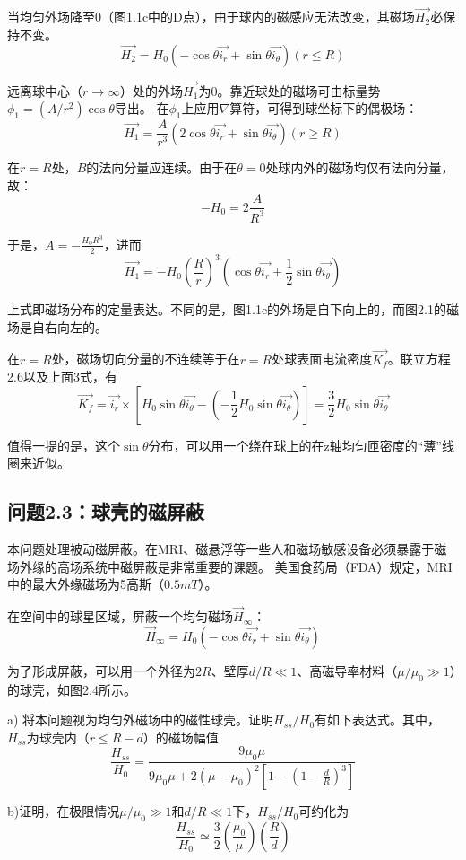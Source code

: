 当均匀外场降至$0$（图1.1c中的D点），由于球内的磁感应无法改变，其磁场$\vec{H_2}$必保持不变。
$$
\vec{H_2}=H_0 (-\cos\theta \vec{i_r}+\sin\theta \vec{i_\theta})  (r\le R)
$$

远离球中心（$r\rightarrow \infty$）处的外场$\vec{H_1}$为0。靠近球处的磁场可由标量势$\phi_1=(A/r^2)\cos\theta$导出。
在$\phi_1$上应用$\nabla$算符，可得到球坐标下的偶极场：
$$
\vec{H_1}=\frac{A}{r^3}(2\cos\theta \vec{i_r}+\sin\theta \vec{i_\theta})  (r\ge R)
$$

在$r=R$处，$B$的法向分量应连续。由于在$\theta=0$处球内外的磁场均仅有法向分量，故：
$$
-H_0=2\frac{A}{R^3}
$$

于是，$A=-\frac{H_0 R^3}{2}$，进而
$$
\vec{H_1}=-H_0(\frac{R}{r})^3 (\cos\theta \vec{i_r}+\frac{1}{2}\sin\theta \vec{i_\theta})
$$

上式即磁场分布的定量表达。不同的是，图1.1c的外场是自下向上的，而图2.1的磁场是自右向左的。

在$r=R$处，磁场切向分量的不连续等于在$r=R$处球表面电流密度$\vec{K_f}$。联立方程2.6以及上面3式，有
\begin{equation}
  \vec{K_f}=\vec{i_r}\times [H_0 \sin\theta \vec{i_\theta}-(-\frac{1}{2}H_0 \sin\theta \vec{i_\theta})]=\frac{3}{2}H_0\sin\theta\vec{i_\theta}
\end{equation}

值得一提的是，这个$\sin\theta$分布，可以用一个绕在球上的在z轴均匀匝密度的“薄”线圈来近似。


\subsection{问题2.3：球壳的磁屏蔽}
本问题处理被动磁屏蔽。在MRI、磁悬浮等一些人和磁场敏感设备必须暴露于磁场外缘的高场系统中磁屏蔽是非常重要的课题。
美国食药局（FDA）规定，MRI中的最大外缘磁场为5高斯（$0.5mT$）。

在空间中的球星区域，屏蔽一个均匀磁场$\vec{H}_\infty$：
$$
\vec{H}_\infty=H_0 (-\cos\theta \vec{i_r}+\sin\theta \vec{i_\theta})
$$

为了形成屏蔽，可以用一个外径为$2R$、壁厚$d/R\ll 1$、高磁导率材料（$\mu/\mu_0 \gg 1$）的球壳，如图2.4所示。

a) 将本问题视为均匀外磁场中的磁性球壳。证明$H_{ss}/H_0$有如下表达式。其中，$H_{ss}$为球壳内（$r\le R-d$）的磁场幅值
\begin{equation}
\frac{H_{ss}}{H_0}=\frac{9\mu_0 \mu}{9\mu_0 \mu+2(\mu-\mu_0)^2\left[1-\left(1-\frac{d}{R}\right)^3\right]}
\end{equation}

b)证明，在极限情况$\mu/\mu_0\gg 1$和$d/R\ll 1$下，$H_{ss}/H_0$可约化为
\begin{equation}
\frac{H_{ss}}{H_0}\simeq \frac{3}{2}(\frac{\mu_0}{\mu})(\frac{R}{d})
\end{equation}

